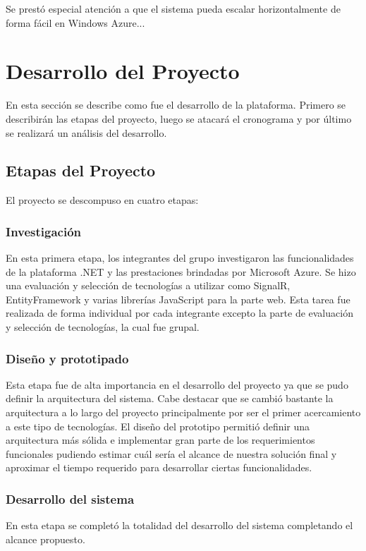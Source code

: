 \documentclass[journal]{IEEEtran}
\begin{document}
Se prestó especial atención a que el sistema pueda escalar horizontalmente de forma fácil en Windows Azure... 

\section{Desarrollo del Proyecto}
En esta sección se describe como fue el desarrollo de la plataforma. Primero se describirán las etapas del proyecto, luego se atacará el cronograma y por último se realizará un análisis del desarrollo.

\subsection{Etapas del Proyecto}
El proyecto se descompuso en cuatro etapas:

\subsubsection{Investigación}
En esta primera etapa, los integrantes del grupo investigaron las funcionalidades de la plataforma .NET y las prestaciones brindadas por Microsoft Azure. Se hizo una evaluación y selección de tecnologías a utilizar como SignalR, EntityFramework y varias librerías JavaScript para la parte web. Esta tarea fue realizada de forma individual por cada integrante excepto la parte de evaluación y selección de tecnologías, la cual fue grupal.

\subsubsection{Diseño y prototipado}
Esta etapa fue de alta importancia en el desarrollo del proyecto ya que se pudo definir la arquitectura del sistema. Cabe destacar que se cambió bastante la arquitectura a lo largo del proyecto principalmente por ser el primer acercamiento a este tipo de tecnologías. El diseño del prototipo permitió definir una arquitectura más sólida e implementar gran parte de los requerimientos funcionales pudiendo estimar cuál sería el alcance de nuestra solución final y aproximar el tiempo requerido para desarrollar ciertas funcionalidades.

\subsubsection{Desarrollo del sistema}
En esta etapa se completó la totalidad del desarrollo del sistema completando el alcance propuesto.
\end{document}
